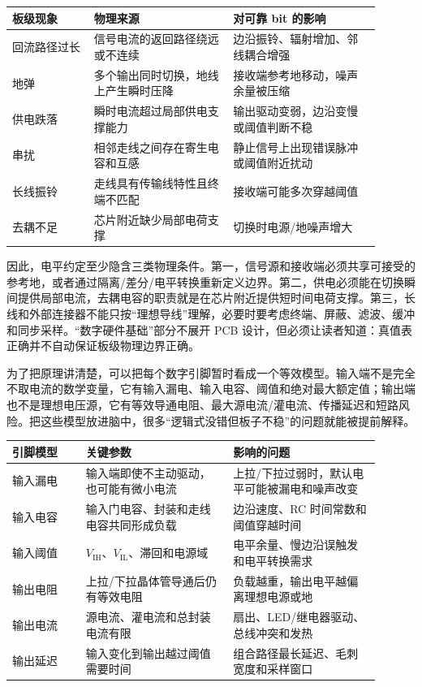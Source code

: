 \begin{longtable}{L{0.2\linewidth}L{0.34\linewidth}L{0.36\linewidth}}
\toprule
板级现象 & 物理来源 & 对可靠 bit 的影响 \\
\midrule
回流路径过长 & 信号电流的返回路径绕远或不连续 & 边沿振铃、辐射增加、邻线耦合增强 \\\tablerowrule
地弹 & 多个输出同时切换，地线上产生瞬时压降 & 接收端参考地移动，噪声余量被压缩 \\\tablerowrule
供电跌落 & 瞬时电流超过局部供电支撑能力 & 输出驱动变弱，边沿变慢或阈值判断不稳 \\\tablerowrule
串扰 & 相邻走线之间存在寄生电容和互感 & 静止信号上出现错误脉冲或阈值附近扰动 \\\tablerowrule
长线振铃 & 走线具有传输线特性且终端不匹配 & 接收端可能多次穿越阈值 \\\tablerowrule
去耦不足 & 芯片附近缺少局部电荷支撑 & 切换时电源/地噪声增大 \\
\bottomrule
\end{longtable}

因此，电平约定至少隐含三类物理条件。第一，信号源和接收端必须共享可接受的参考地，或者通过隔离/差分/电平转换重新定义边界。第二，供电必须能在切换瞬间提供局部电流，去耦电容的职责就是在芯片附近提供短时间电荷支撑。第三，长线和外部连接器不能只按“理想导线”理解，必要时要考虑终端、屏蔽、滤波、缓冲和同步采样。“数字硬件基础”部分不展开 PCB 设计，但必须让读者知道：真值表正确并不自动保证板级物理边界正确。

为了把原理讲清楚，可以把每个数字引脚暂时看成一个等效模型。输入端不是完全不取电流的数学变量，它有输入漏电、输入电容、阈值和绝对最大额定值；输出端也不是理想电压源，它有等效导通电阻、最大源电流/灌电流、传播延迟和短路风险。把这些模型放进脑中，很多“逻辑式没错但板子不稳”的问题就能被提前解释。

\begin{longtable}{L{0.18\linewidth}L{0.36\linewidth}L{0.36\linewidth}}
\toprule
引脚模型 & 关键参数 & 影响的问题 \\
\midrule
输入漏电 & 输入端即使不主动驱动，也可能有微小电流 & 上拉/下拉过弱时，默认电平可能被漏电和噪声改变 \\\tablerowrule
输入电容 & 输入门电容、封装和走线电容共同形成负载 & 边沿速度、RC 时间常数和阈值穿越时间 \\\tablerowrule
输入阈值 & $V_\mathrm{IH}$、$V_\mathrm{IL}$、滞回和电源域 & 电平余量、慢边沿误触发和电平转换需求 \\\tablerowrule
输出电阻 & 上拉/下拉晶体管导通后仍有等效电阻 & 负载越重，输出电平越偏离理想电源或地 \\\tablerowrule
输出电流 & 源电流、灌电流和总封装电流有限 & 扇出、LED/继电器驱动、总线冲突和发热 \\\tablerowrule
输出延迟 & 输入变化到输出越过阈值需要时间 & 组合路径最长延迟、毛刺宽度和采样窗口 \\
\bottomrule
\end{longtable}

